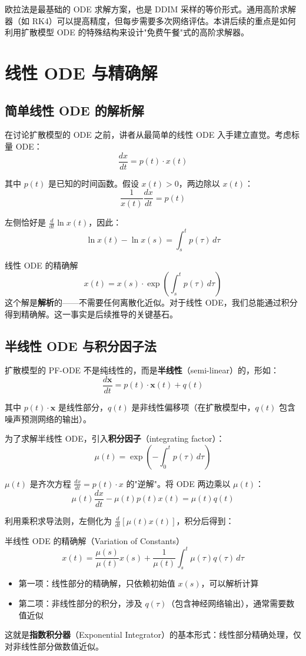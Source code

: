 \documentclass[a4paper]{article}
\begin{document}
欧拉法是最基础的 ODE 求解方案，也是 DDIM 采样的等价形式。通用高阶求解器（如 RK4）可以提高精度，但每步需要多次网络评估。本讲后续的重点是如何利用扩散模型 ODE 的特殊结构来设计"免费午餐"式的高阶求解器。


\section{线性 ODE 与精确解}

\subsection{简单线性 ODE 的解析解}

在讨论扩散模型的 ODE 之前，讲者从最简单的线性 ODE 入手建立直觉。考虑标量 ODE：
$$\frac{dx}{dt} = p(t) \cdot x(t)$$

其中 $p(t)$ 是已知的时间函数。假设 $x(t) > 0$，两边除以 $x(t)$：
$$\frac{1}{x(t)} \frac{dx}{dt} = p(t)$$

左侧恰好是 $\frac{d}{dt} \ln x(t)$，因此：
$$\ln x(t) - \ln x(s) = \int_s^t p(\tau)\, d\tau$$

\begin{importantbox}{线性 ODE 的精确解}
$$x(t) = x(s) \cdot \exp\left(\int_s^t p(\tau)\, d\tau\right)$$
这个解是\textbf{解析}的——不需要任何离散化近似。对于线性 ODE，我们总能通过积分得到精确解。这一事实是后续推导的关键基石。
\end{importantbox}

\subsection{半线性 ODE 与积分因子法}

扩散模型的 PF-ODE 不是纯线性的，而是\textbf{半线性}（semi-linear）的，形如：
$$\frac{d\mathbf{x}}{dt} = p(t) \cdot \mathbf{x}(t) + q(t)$$

其中 $p(t) \cdot \mathbf{x}$ 是线性部分，$q(t)$ 是非线性偏移项（在扩散模型中，$q(t)$ 包含噪声预测网络的输出）。

为了求解半线性 ODE，引入\textbf{积分因子}（integrating factor）：
$$\mu(t) = \exp\left(-\int_0^t p(\tau)\, d\tau\right)$$

$\mu(t)$ 是齐次方程 $\frac{dx}{dt} = p(t) \cdot x$ 的"逆解"。将 ODE 两边乘以 $\mu(t)$：
$$\mu(t) \frac{dx}{dt} - \mu(t) p(t) x(t) = \mu(t) q(t)$$

利用乘积求导法则，左侧化为 $\frac{d}{dt}\left[\mu(t) x(t)\right]$，积分后得到：

\begin{importantbox}{半线性 ODE 的精确解（Variation of Constants）}
$$x(t) = \frac{\mu(s)}{\mu(t)} x(s) + \frac{1}{\mu(t)} \int_s^t \mu(\tau) q(\tau)\, d\tau$$
\begin{itemize}
    \item 第一项：线性部分的精确解，只依赖初始值 $x(s)$，可以解析计算
    \item 第二项：非线性部分的积分，涉及 $q(\tau)$（包含神经网络输出），通常需要数值近似
\end{itemize}
这就是\textbf{指数积分器}（Exponential Integrator）的基本形式：线性部分精确处理，仅对非线性部分做数值近似。
\end{importantbox}
\end{document}

